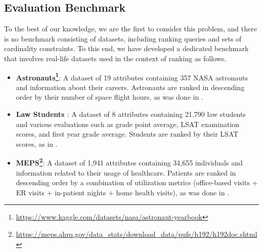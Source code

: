 \subsection{Evaluation Benchmark}\label{sec:benchmark}
To the best of our knowledge, we are the first to consider this problem, and there is no benchmark consisting of datasets, including ranking queries and sets of cardinality constraints. To this end, we have developed a dedicated benchmark that involves real-life datasets used in the context of ranking as follows. 
\begin{itemize}[leftmargin=1em,labelwidth=*,align=left]
    \item {\bf Astronauts\footnote{\url{https://www.kaggle.com/datasets/nasa/astronaut-yearbook}}}: A dataset of 19 attributes containing 357 NASA astronauts and information about their careers. Astronauts are ranked in descending order by their number of space flight hours, as was done in \cite{SYJ18}.
    \item {\bf Law Students \cite{LawDataOriginal,LawData}}: A dataset of 8 attributes containing 21,790 law students and various evaluations such as grade point average, LSAT examination scores, and first year grade average. Students are ranked by their LSAT scores, as in \cite{ZHW20}.
    \item {\bf MEPS\footnote{\url{https://meps.ahrq.gov/data\_stats/download\_data/pufs/h192/h192doc.shtml}}}: A dataset of 1,941 attributes containing 34,655 individuals and information related to their usage of healthcare. Patients are ranked in descending order by a combination of utilization metrics (office-based visits + ER visits + in-patient nights + home health visits), as was done in \cite{YGS19}. 
\end{itemize}

